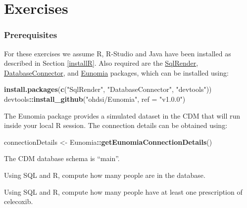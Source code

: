 \documentclass[11pt]{book}
\newenvironment{Shaded}{\begin{snugshade}}{\end{snugshade}}
\newcommand{\DataTypeTok}[1]{\textcolor[rgb]{0.13,0.29,0.53}{#1}}
\newcommand{\KeywordTok}[1]{\textcolor[rgb]{0.13,0.29,0.53}{\textbf{#1}}}
\newcommand{\NormalTok}[1]{#1}
\newcommand{\OperatorTok}[1]{\textcolor[rgb]{0.81,0.36,0.00}{\textbf{#1}}}
\newcommand{\StringTok}[1]{\textcolor[rgb]{0.31,0.60,0.02}{#1}}
\theoremstyle{definition}
\theoremstyle{definition}
\theoremstyle{definition}
\theoremstyle{remark}
\let\BeginKnitrBlock\begin \let\EndKnitrBlock\end
\begin{document}
\hypertarget{exercises-2}{%
\section{Exercises}\label{exercises-2}}

\hypertarget{prerequisites-1}{%
\subsubsection*{Prerequisites}\label{prerequisites-1}}

For these exercises we assume R, R-Studio and Java have been installed as described in Section \ref{installR}. Also required are the \href{https://ohdsi.github.io/SqlRender/}{SqlRender}, \href{https://ohdsi.github.io/DatabaseConnector/}{DatabaseConnector}, and \href{https://ohdsi.github.io/Eunomia/}{Eunomia} packages, which can be installed using:

\begin{Shaded}
\begin{Highlighting}[]
\KeywordTok{install.packages}\NormalTok{(}\KeywordTok{c}\NormalTok{(}\StringTok{"SqlRender"}\NormalTok{, }\StringTok{"DatabaseConnector"}\NormalTok{, }\StringTok{"devtools"}\NormalTok{))}
\NormalTok{devtools}\OperatorTok{::}\KeywordTok{install_github}\NormalTok{(}\StringTok{"ohdsi/Eunomia"}\NormalTok{, }\DataTypeTok{ref =} \StringTok{"v1.0.0"}\NormalTok{)}
\end{Highlighting}
\end{Shaded}

The Eunomia package provides a simulated dataset in the CDM that will run inside your local R session. The connection details can be obtained using:

\begin{Shaded}
\begin{Highlighting}[]
\NormalTok{connectionDetails <-}\StringTok{ }\NormalTok{Eunomia}\OperatorTok{::}\KeywordTok{getEunomiaConnectionDetails}\NormalTok{()}
\end{Highlighting}
\end{Shaded}

The CDM database schema is ``main''.

\BeginKnitrBlock{exercise}
\protect\hypertarget{exr:exercisePeopleCount}{}{\label{exr:exercisePeopleCount} }Using SQL and R, compute how many people are in the database.
\EndKnitrBlock{exercise}

\BeginKnitrBlock{exercise}
\protect\hypertarget{exr:exerciseCelecoxibUsers}{}{\label{exr:exerciseCelecoxibUsers} }Using SQL and R, compute how many people have at least one prescription of celecoxib.
\EndKnitrBlock{exercise}
\end{document}
